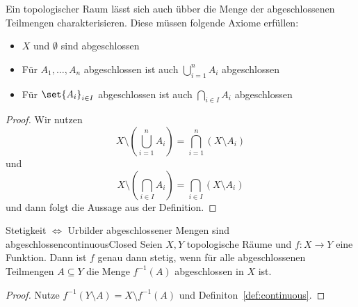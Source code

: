\documentclass[language=ngerman]{TemplateLecture} %
\begin{document}
\begin{remark}
    Ein topologischer Raum lässt sich auch übber die Menge der abgeschlossenen Teilmengen charakterisieren. Diese müssen folgende Axiome erfüllen:
    \begin{itemize}
        \item[$(A1)$] $X$ und $\emptyset$ sind abgeschlossen
        \item[$(A2)$] Für $A_1, \ldots, A_n$ abgeschlossen ist auch $\bigcup_{i = 1}^n A_i$ abgeschlossen
        \item[$(A3)$] Für $\set{A_i}_{i \in I}$ abgeschlossen ist auch $\bigcap_{i \in I} A_i$ abgeschlossen 
    \end{itemize}
\end{remark}
\begin{proof}
    Wir nutzen
    \begin{equation*}
        X \setminus \left(\bigcup_{i = 1}^n A_i\right) = \bigcap_{i = 1}^n \left(X \setminus A_i\right)
    \end{equation*}
    und
    \begin{equation*}
        X \setminus \left(\bigcap_{i \in I} A_i\right) = \bigcap_{i \in I} \left(X \setminus A_i\right)
    \end{equation*}
    und dann folgt die Aussage aus der Definition.
\end{proof}

\begin{lem}{Stetigkeit $\Leftrightarrow$ Urbilder abgeschlossener Mengen sind abgeschlossen}{continuousClosed}
    Seien $X, Y$ topologische Räume und $f: X \to Y$ eine Funktion. Dann ist $f$ genau dann stetig, wenn für alle abgeschlossenen Teilmengen $A \subseteq Y$ die Menge $f^{-1}(A)$ abgeschlossen in $X$ ist.
\end{lem}
\begin{proof}
    Nutze $f^{-1}(Y \setminus A) = X \setminus f^{-1}(A)$ und Definiton~\ref{def:continuous}.
\end{proof}
\end{document}
